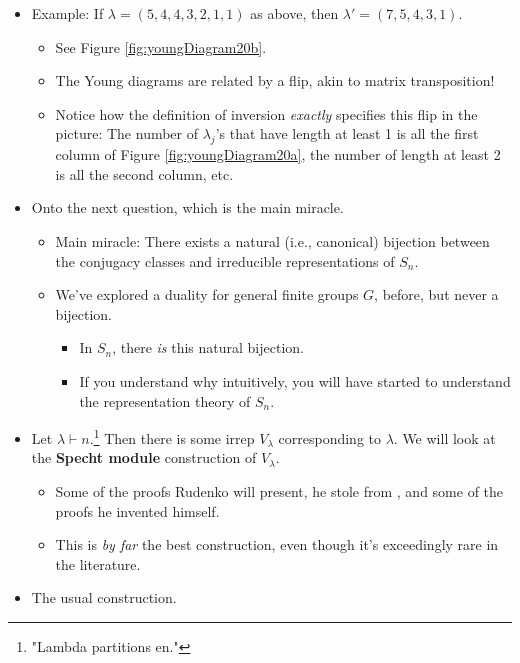 \documentclass[../notes.tex]{subfiles}
\begin{document}
\begin{itemize}
\begin{itemize}
    \end{itemize}
    \item Example: If $\lambda=(5,4,4,3,2,1,1)$ as above, then $\lambda'=(7,5,4,3,1)$.
    \begin{itemize}
        \item See Figure \ref{fig:youngDiagram20b}.
        \item The Young diagrams are related by a flip, akin to matrix transposition!
        \item Notice how the definition of inversion \emph{exactly} specifies this flip in the picture: The number of $\lambda_j$'s that have length at least 1 is all the first column of Figure \ref{fig:youngDiagram20a}, the number of length at least 2 is all the second column, etc.
    \end{itemize}
    \item Onto the next question, which is the main miracle.
    \begin{itemize}
        \item Main miracle: There exists a natural (i.e., canonical) bijection between the conjugacy classes and irreducible representations of $S_n$.
        \item We've explored a duality for general finite groups $G$, before, but never a bijection.
        \begin{itemize}
            \item In $S_n$, there \emph{is} this natural bijection.
            \item If you understand why intuitively, you will have started to understand the representation theory of $S_n$.
        \end{itemize}
    \end{itemize}
    \item Let $\lambda\vdash n$.\footnote{"Lambda partitions en."} Then there is some irrep $V_\lambda$ corresponding to $\lambda$. We will look at the \textbf{Specht module} construction of $V_\lambda$.
    \begin{itemize}
        \item Some of the proofs Rudenko will present, he stole from \textcite{bib:Etingof}, and some of the proofs he invented himself.
        \item This is \emph{by far} the best construction, even though it's exceedingly rare in the literature.
    \end{itemize}
    \item The usual construction.
    \begin{itemize}

\end{itemize}
\end{itemize}
\end{document}
